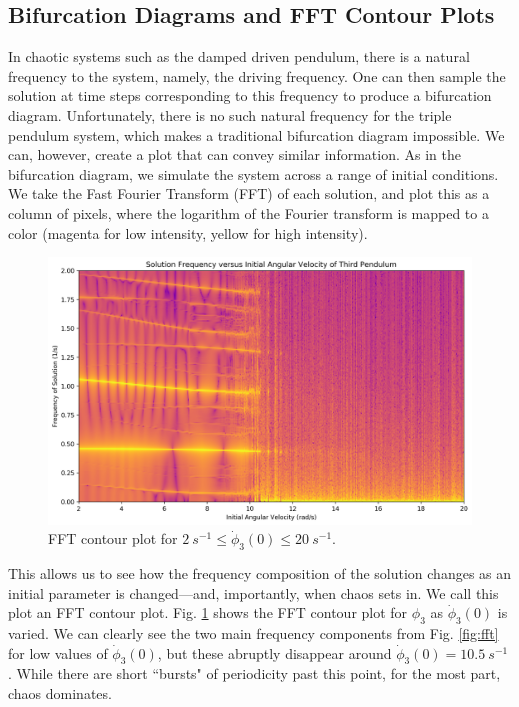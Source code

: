 \documentclass{article}
\begin{document}
\subsection{Bifurcation Diagrams and FFT Contour Plots}
In chaotic systems such as the damped driven pendulum, there is a natural
frequency to the system, namely, the driving frequency. One can then sample 
the solution at time steps corresponding to this frequency to produce a
bifurcation diagram.  Unfortunately, there is no such natural frequency for
the triple pendulum system, which makes a traditional bifurcation diagram 
impossible.  We can, however, create a plot that can convey similar 
information. As in the bifurcation diagram, we simulate the system across 
a range of initial conditions. We take the Fast Fourier Transform (FFT) of 
each solution, and plot this as a column of pixels, where the logarithm of 
the Fourier transform is mapped to a color (magenta for low intensity, yellow 
for high intensity). 
\begin{figure}[h]
	\centering
	\includegraphics[width=\textwidth]{contour_3}
	\caption{FFT contour plot for $\SI{2}{s^{-1}}\le\dot\phi_3(0)
    	\le\SI{20}{s^{-1}}$.}
	\label{fig:contour_3}
\end{figure}
This allows us to see how the frequency composition of the
solution changes as an initial parameter is changed---and, importantly, when 
chaos sets in. We call this plot an FFT contour plot. Fig. \ref{fig:contour_3} 
shows the FFT contour plot for $\phi_3$ as $\dot\phi_3(0)$ is varied. We can
clearly see the two main frequency components from Fig. \ref{fig:fft} for 
low values of $\dot\phi_3(0)$, but these abruptly disappear around $\dot
\phi_3(0)=\SI{10.5}{s^{-1}}$. While there are short ``bursts" of periodicity
past this point, for the most part, chaos dominates.
\end{document}
